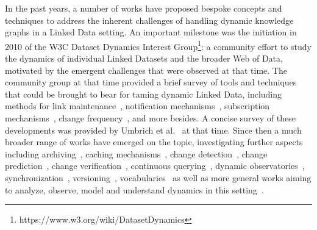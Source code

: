 \documentclass[sw]{iosart2x}
\begin{document}
In the past years, a number of works have proposed bespoke concepts and techniques to address the inherent challenges of handling dynamic knowledge graphs in a Linked Data setting. An important milestone was the initiation in 2010 of the W3C Dataset Dynamics Interest Group\footnote{https://www.w3.org/wiki/DatasetDynamics}: a community effort to study the dynamics of individual Linked Datasets and the broader Web of Data, motivated by the emergent challenges that were observed at that time. The community group at that time provided a brief survey of tools and techniques that could be brought to bear for taming dynamic Linked Data, including methods for link maintenance~\cite{PopitschH10,PopitschH11}, notification mechanisms~\cite{TrampFEA10}, subscription mechanisms~\cite{Fitzpatrick10,PassantM10}, change frequency~\cite{UmbrichHHPD10}, and more besides. A concise survey of these developments was provided by Umbrich et al.~\cite{UmbrichVH10} at that time. Since then a much broader range of works have emerged on the topic, investigating further aspects including archiving~\cite{UmbrichMP15}, caching mechanisms~\cite{MartinUA10,LampoVDR11,UmbrichKHP12,DehghanzadehPKUHD14,DividinoGS15,Kjernsmo15,ZhangSTQ15,NishiokaS17,dehghanzadeh2017}, change detection~\cite{ZeginisTC11,PapavasileiouFFKC13,DividinoKG14,PernelleSMT16}, change prediction~\cite{GonzalezH18,LoustaunauH19}, change verification~\cite{NishiokaS18}, continuous querying~\cite{DehghanzadehDGV15}, dynamic observatories~\cite{KaferUHP12}, synchronization~\cite{KnuthHS16,TummarelloMBE07}, versioning~\cite{GraubeHU14}, vocabularies~\cite{Berners04,Dady10} as well as more general works aiming to analyze, observe, model and understand dynamics in this setting~\cite{RulaPHSM12,DividinoSGG13,KaferAUOH13,DividinoGSG14,KaferWA17,NishiokaS15,NishiokaS16}.



\end{document}
